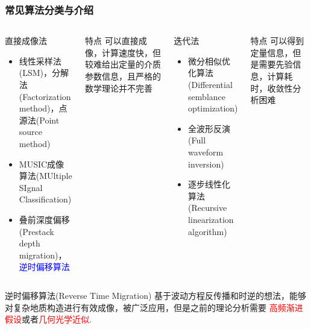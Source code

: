 \documentclass[8pt]{beamer}
\begin{document}
\begin{frame}
\frametitle{常见算法分类与介绍}
\begin{columns}
	
	
	\begin{block}{直接成像法}
		\begin{itemize}
			\item 线性采样法(LSM)，分解法(Factorization method)，点源法(Point source method)
			\item MUSIC成像算法(MUltiple SIgnal Classification)
			\item 叠前深度偏移(Prestack depth migration)，\textcolor{blue}{逆时偏移算法}
		\end{itemize}
		
	\end{block}
	\begin{block}{特点}
		可以直接成像，计算速度快，但较难给出定量的介质参数信息，且严格的数学理论并不完善
	\end{block}
	
	\begin{block}{迭代法}
		\begin{itemize}
			\item 微分相似优化算法(Differential semblance optimization)
			\item 全波形反演(Full waveform inversion)
			\item 逐步线性化算法(Recursive linearization algorithm)
		\end{itemize}
	\end{block}
	\begin{block}{特点}
		可以得到定量信息，但是需要先验信息，计算耗时，收敛性分析困难
	\end{block}
\end{columns}
\begin{block}{逆时偏移算法(Reverse Time Migration)}
	基于波动方程反传播和时逆的想法，能够对复杂地质构造进行有效成像，被广泛应用，但是之前的理论分析需要
	\textcolor{red}{高频渐进假设}或者\textcolor{red}{几何光学近似}.
\end{block}
\end{frame}
\end{document}
